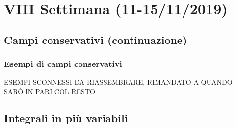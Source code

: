 \chapter{VIII Settimana (11-15/11/2019)}

\section{Campi conservativi (continuazione)}


\subsection{Esempi di campi conservativi}
ESEMPI SCONNESSI DA RIASSEMBRARE, RIMANDATO A QUANDO SARÒ IN PARI COL RESTO

\newpage

\section{Integrali in più variabili}

